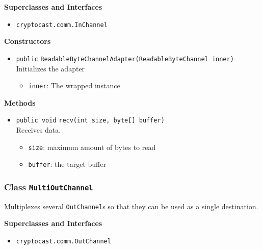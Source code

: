 \textbf{Superclasses and Interfaces}
\begin{itemize}
\item \lstinline|cryptocast.comm.InChannel|
\end{itemize}



\textbf{Constructors}
\begin{itemize}
\item \lstinline|public| \lstinline|ReadableByteChannelAdapter|\lstinline|(ReadableByteChannel inner)|\\
Initializes the adapter
\begin{itemize}
\item \lstinline|inner|: The wrapped instance
\end{itemize}



\end{itemize}


\textbf{Methods}
\begin{itemize}
\item \lstinline|public void| \lstinline|recv|\lstinline|(int size, byte[] buffer)|\\
Receives data.
\begin{itemize}
\item \lstinline|size|: maximum amount of bytes to read
\item \lstinline|buffer|: the target buffer
\end{itemize}



\end{itemize}

\subsubsection{Class \lstinline|MultiOutChannel|}
Multiplexes several \lstinline|OutChannel|s so that they can be used as a single
 destination. \\



\textbf{Superclasses and Interfaces}
\begin{itemize}
\item \lstinline|cryptocast.comm.OutChannel|
\end{itemize}



